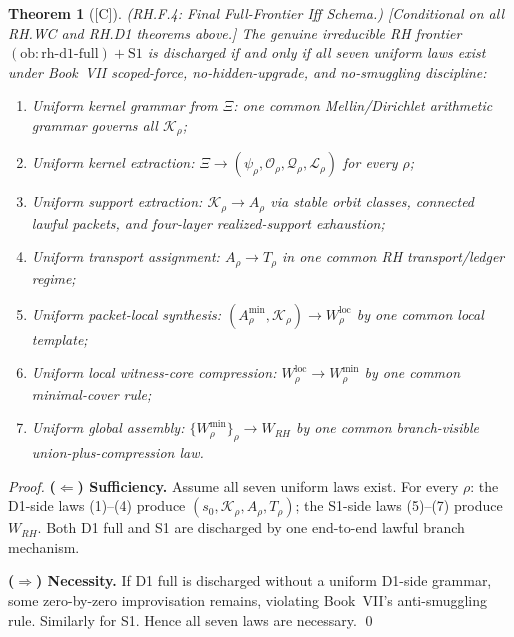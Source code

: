 \documentclass[12pt,oneside]{amsbook}
\theoremstyle{plain}
\newtheorem{theorem}{Theorem}[section]
\theoremstyle{definition}
\theoremstyle{remark}
\newcommand{\status}[1]{\textup{[#1]}}
\begin{document}
\begin{theorem}[\status{C}]\label{thm:rh-f4}
\textup{(RH.F.4: Final Full-Frontier Iff Schema.)}
\textup{[Conditional on all RH.WC and RH.D1 theorems above.]}
The genuine irreducible RH frontier
$(\mathrm{ob{:}rh\text{-}d1\text{-}full}) + \mathrm{S1}$
is discharged if and only if all seven uniform laws exist under
Book~VII scoped-force, no-hidden-upgrade, and no-smuggling
discipline:
\begin{enumerate}[label=\textup{(\arabic*)}]
 \item \emph{Uniform kernel grammar from $\Xi$}: one common
 Mellin/Dirichlet arithmetic grammar governs all $\mathcal{K}_\rho$;
 \item \emph{Uniform kernel extraction}:
 $\Xi \to (\psi_\rho, \mathcal{O}_\rho, \mathcal{Q}_\rho,
 \mathcal{L}_\rho)$ for every $\rho$;
 \item \emph{Uniform support extraction}:
 $\mathcal{K}_\rho \to A_\rho$ via stable orbit classes,
 connected lawful packets, and four-layer realized-support
 exhaustion;
 \item \emph{Uniform transport assignment}:
 $A_\rho \to T_\rho$ in one common RH transport/ledger regime;
 \item \emph{Uniform packet-local synthesis}:
 $(A_\rho^{\min}, \mathcal{K}_\rho) \to W_\rho^{\mathrm{loc}}$
 by one common local template;
 \item \emph{Uniform local witness-core compression}:
 $W_\rho^{\mathrm{loc}} \to W_\rho^{\min}$ by one common
 minimal-cover rule;
 \item \emph{Uniform global assembly}:
 $\{W_\rho^{\min}\}_\rho \to W_{RH}$ by one common
 branch-visible union-plus-compression law.
\end{enumerate}
\end{theorem}

\begin{proof}
\textbf{($\Leftarrow$) Sufficiency.}
Assume all seven uniform laws exist. For every $\rho$:
the D1-side laws (1)--(4) produce $(s_0, \mathcal{K}_\rho,
A_\rho, T_\rho)$; the S1-side laws (5)--(7) produce
$W_{RH}$. Both D1 full and S1 are discharged by one
end-to-end lawful branch mechanism.

\textbf{($\Rightarrow$) Necessity.}
If D1 full is discharged without a uniform D1-side grammar, some
zero-by-zero improvisation remains, violating Book~VII's anti-smuggling
rule. Similarly for S1. Hence all seven laws are necessary. \qed
\end{proof}
\end{document}
